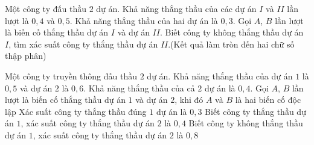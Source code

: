 \begin{bt}%

	Một công ty đấu thầu $2$ dự án. Khả năng thắng thầu của các dự án $I$ và $II$ lần lượt là $0{,}4$ và $0{,}5$. Khả năng thắng thầu của hai dự án là $0{,}3$. Gọi $A$, $B$ lần lượt là biến cố thắng thầu dự án $I$ và dự án $II$. Biết công ty không thắng thầu dự án $I$, tìm xác suất công ty thắng thầu dự án $II$.(Kết quả làm tròn đến hai chữ số thập phân)
\end{bt}

\begin{ex}%
	Một công ty truyền thông đấu thầu $2$ dự án. Khả năng thắng thầu của dự án $1$ là $0{,}5$ và dự án $2$ là $0{,}6$. Khả năng thắng thầu của cả $2$ dự án là $0{,}4$. Gọi $A$, $B$ lần lượt là biến cố thắng thầu dự án $1$ và dự án $2$, khi đó
	\choiceTF
	{$A$ và $B$ là hai biến cố độc lập}
	{\True Xác suất công ty thắng thầu đúng $1$ dự án là $0{,}3$}
	{Biết công ty thắng thầu dự án $1$, xác suất công ty thắng thầu dự án $2$ là $0{,}4$}
	{Biết công ty không thắng thầu dự án $1$, xác suất công ty thắng thầu dự án $2$ là $0{,}8$}
\end{ex}

